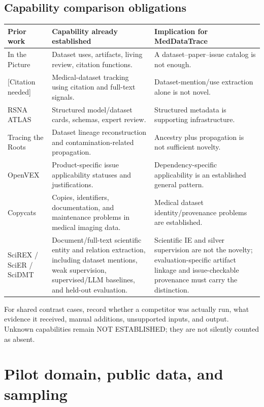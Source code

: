 \documentclass[11pt,a4paper]{article}
\newcommand{\status}[1]{\textsf{\small #1}}
\begin{document}
\subsection{Capability comparison obligations}
\begin{tabularx}{\linewidth}{@{}L{35mm}Y Y@{}}
\toprule
\textbf{Prior work} & \textbf{Capability already established} & \textbf{Implication for MedDataTrace}\\ \midrule
In the Picture \cite{inthepicture2025} & Dataset uses, artifacts, living review, citation functions. & A dataset--paper--issue catalog is not enough.\\
{[Citation needed]} \cite{sourget2024} & Medical-dataset tracking using citation and full-text signals. & Dataset-mention/use extraction alone is not novel.\\
RSNA ATLAS \cite{atlas} & Structured model/dataset cards, schemas, expert review. & Structured metadata is supporting infrastructure.\\
Tracing the Roots \cite{tracing2026} & Dataset lineage reconstruction and contamination-related propagation. & Ancestry plus propagation is not sufficient novelty.\\
OpenVEX \cite{openvex} & Product-specific issue applicability statuses and justifications. & Dependency-specific applicability is an established general pattern.\\
Copycats \cite{copycats} & Copies, identifiers, documentation, and maintenance problems in medical imaging data. & Medical dataset identity/provenance problems are established.\\
SciREX / SciER / SciDMT \cite{scirex2020,scier2024,scidmt2024} & Document/full-text scientific entity and relation extraction, including dataset mentions, weak supervision, supervised/LLM baselines, and held-out evaluation. & Scientific IE and silver supervision are not the novelty; evaluation-specific artifact linkage and issue-checkable provenance must carry the distinction.\\
\bottomrule
\end{tabularx}

For shared contrast cases, record whether a competitor was actually run, what evidence it received, manual additions, unsupported inputs, and output. Unknown capabilities remain \status{NOT ESTABLISHED}; they are not silently counted as absent.

\section{Pilot domain, public data, and sampling}
\label{sec:data}
\end{document}
